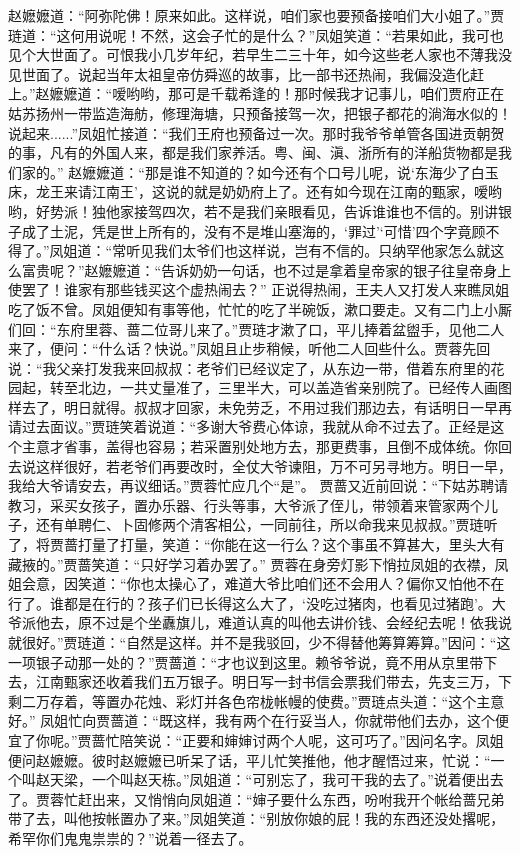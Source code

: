 \documentclass[12pt,oneside]{book}
\begin{document}
赵嬷嬷道：“阿弥陀佛！原来如此。这样说，咱们家也要预备接咱们大小姐了。”贾琏道：“这何用说呢！不然，这会子忙的是什么？”凤姐笑道：“若果如此，我可也见个大世面了。可恨我小几岁年纪，若早生二三十年，如今这些老人家也不薄我没见世面了。说起当年太祖皇帝仿舜巡的故事，比一部书还热闹，我偏没造化赶上。”赵嬷嬷道：“嗳哟哟，那可是千载希逢的！那时候我才记事儿，咱们贾府正在姑苏扬州一带监造海舫，修理海塘，只预备接驾一次，把银子都花的淌海水似的！说起来......”凤姐忙接道：“我们王府也预备过一次。那时我爷爷单管各国进贡朝贺的事，凡有的外国人来，都是我们家养活。粤、闽、滇、浙所有的洋船货物都是我们家的。”
赵嬷嬷道：“那是谁不知道的？如今还有个口号儿呢，说‘东海少了白玉床，龙王来请江南王’，这说的就是奶奶府上了。还有如今现在江南的甄家，嗳哟哟，好势派！独他家接驾四次，若不是我们亲眼看见，告诉谁谁也不信的。别讲银子成了土泥，凭是世上所有的，没有不是堆山塞海的，‘罪过’‘可惜’四个字竟顾不得了。”凤姐道：“常听见我们太爷们也这样说，岂有不信的。只纳罕他家怎么就这么富贵呢？”赵嬷嬷道：“告诉奶奶一句话，也不过是拿着皇帝家的银子往皇帝身上使罢了！谁家有那些钱买这个虚热闹去？”
正说得热闹，王夫人又打发人来瞧凤姐吃了饭不曾。凤姐便知有事等他，忙忙的吃了半碗饭，漱口要走。又有二门上小厮们回：“东府里蓉、蔷二位哥儿来了。”贾琏才漱了口，平儿捧着盆盥手，见他二人来了，便问：“什么话？快说。”凤姐且止步稍候，听他二人回些什么。贾蓉先回说：“我父亲打发我来回叔叔：老爷们已经议定了，从东边一带，借着东府里的花园起，转至北边，一共丈量准了，三里半大，可以盖造省亲别院了。已经传人画图样去了，明日就得。叔叔才回家，未免劳乏，不用过我们那边去，有话明日一早再请过去面议。”贾琏笑着说道：“多谢大爷费心体谅，我就从命不过去了。正经是这个主意才省事，盖得也容易；若采置别处地方去，那更费事，且倒不成体统。你回去说这样很好，若老爷们再要改时，全仗大爷谏阻，万不可另寻地方。明日一早，我给大爷请安去，再议细话。”贾蓉忙应几个“是”。
贾蔷又近前回说：“下姑苏聘请教习，采买女孩子，置办乐器、行头等事，大爷派了侄儿，带领着来管家两个儿子，还有单聘仁、卜固修两个清客相公，一同前往，所以命我来见叔叔。”贾琏听了，将贾蔷打量了打量，笑道：“你能在这一行么？这个事虽不算甚大，里头大有藏掖的。”贾蔷笑道：“只好学习着办罢了。”
贾蓉在身旁灯影下悄拉凤姐的衣襟，凤姐会意，因笑道：“你也太操心了，难道大爷比咱们还不会用人？偏你又怕他不在行了。谁都是在行的？孩子们已长得这么大了，‘没吃过猪肉，也看见过猪跑’。大爷派他去，原不过是个坐纛旗儿，难道认真的叫他去讲价钱、会经纪去呢！依我说就很好。”贾琏道：“自然是这样。并不是我驳回，少不得替他筹算筹算。”因问：“这一项银子动那一处的？”贾蔷道：“才也议到这里。赖爷爷说，竟不用从京里带下去，江南甄家还收着我们五万银子。明日写一封书信会票我们带去，先支三万，下剩二万存着，等置办花烛、彩灯并各色帘栊帐幔的使费。”贾琏点头道：“这个主意好。”
凤姐忙向贾蔷道：“既这样，我有两个在行妥当人，你就带他们去办，这个便宜了你呢。”贾蔷忙陪笑说：“正要和婶婶讨两个人呢，这可巧了。”因问名字。凤姐便问赵嬷嬷。彼时赵嬷嬷已听呆了话，平儿忙笑推他，他才醒悟过来，忙说：“一个叫赵天梁，一个叫赵天栋。”凤姐道：“可别忘了，我可干我的去了。”说着便出去了。贾蓉忙赶出来，又悄悄向凤姐道：“婶子要什么东西，吩咐我开个帐给蔷兄弟带了去，叫他按帐置办了来。”凤姐笑道：“别放你娘的屁！我的东西还没处撂呢，希罕你们鬼鬼祟祟的？”说着一径去了。
\end{document}
